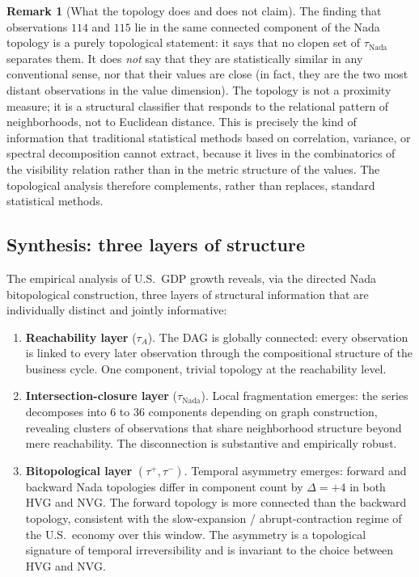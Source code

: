 \documentclass[11pt,a4paper]{article}
\theoremstyle{plain}
\theoremstyle{definition}
\newtheorem{remark}[theorem]{Remark}
\newcommand{\taufwd}{\tau^{+}}
\newcommand{\taubwd}{\tau^{-}}
\begin{document}
\begin{remark}[What the topology does and does not claim]%
\label{rem:topology-claims}
The finding that observations $114$ and $115$ lie in the same connected
component of the Nada topology is a purely topological statement: it
says that no clopen set of $\tau_{\text{Nada}}$ separates them. It does
\emph{not} say that they are statistically similar in any conventional
sense, nor that their values are close (in fact, they are the two most
distant observations in the value dimension). The topology is not a
proximity measure; it is a structural classifier that responds to the
relational pattern of neighborhoods, not to Euclidean distance. This is
precisely the kind of information that traditional statistical methods
based on correlation, variance, or spectral decomposition cannot
extract, because it lives in the combinatorics of the visibility
relation rather than in the metric structure of the values. The
topological analysis therefore complements, rather than replaces,
standard statistical methods.
\end{remark}

\subsection{Synthesis: three layers of structure}%
\label{subsec:synthesis}

The empirical analysis of U.S.\ GDP growth reveals, via the directed
Nada bitopological construction, three layers of structural information
that are individually distinct and jointly informative:

\begin{enumerate}[label=(\arabic*), leftmargin=2em]
\item \textbf{Reachability layer} ($\tau_A$). The DAG is globally
connected: every observation is linked to every later observation
through the compositional structure of the business cycle. One
component, trivial topology at the reachability level.

\item \textbf{Intersection-closure layer} ($\tau_{\text{Nada}}$). Local
fragmentation emerges: the series decomposes into $6$ to $36$ components
depending on graph construction, revealing clusters of observations
that share neighborhood structure beyond mere reachability. The
disconnection is substantive and empirically robust.

\item \textbf{Bitopological layer} $(\taufwd, \taubwd)$. Temporal
asymmetry emerges: forward and backward Nada topologies differ in
component count by $\Delta = +4$ in both HVG and NVG. The forward
topology is more connected than the backward topology, consistent with
the slow-expansion / abrupt-contraction regime of the U.S.\ economy
over this window. The asymmetry is a topological signature of temporal
irreversibility and is invariant to the choice between HVG and NVG.
\end{enumerate}
\end{document}
